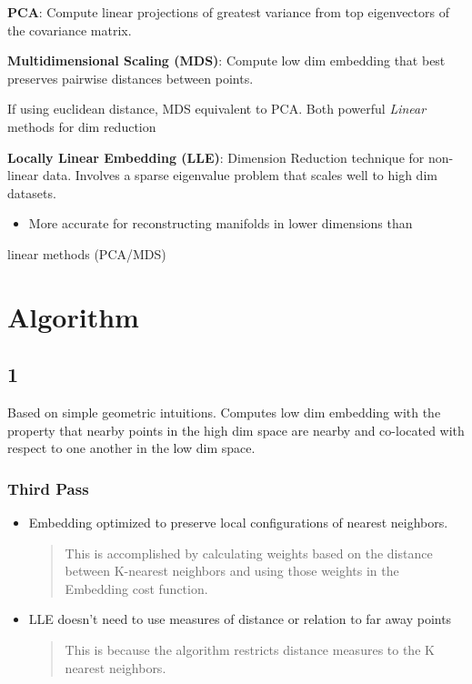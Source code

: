 \documentclass[11pt]{article}
\begin{document}
\textbf{PCA}: Compute linear projections of greatest variance from top eigenvectors
 of the covariance matrix.

\textbf{Multidimensional Scaling (MDS)}: Compute low dim embedding that best preserves pairwise distances between points.

If using euclidean distance, MDS equivalent to PCA. Both powerful \emph{Linear}
methods for dim reduction

\textbf{Locally Linear Embedding (LLE)}: Dimension Reduction technique for non-linear
 data. Involves a sparse eigenvalue problem that scales well to high dim
 datasets.
\begin{itemize}
\item More accurate for reconstructing manifolds in lower dimensions than
\end{itemize}
linear methods (PCA/MDS)

\section{Algorithm}
\label{sec:org1587b14}
\subsection{1}
\label{sec:orgc36deeb}
Based on simple geometric intuitions. Computes low dim embedding with the
property that nearby points in the high dim space are nearby and co-located with
respect to one another in the low dim space.

\subsubsection{Third Pass}
\label{sec:org9ba6a15}
\begin{itemize}
\item Embedding optimized to preserve local configurations of nearest neighbors.
\begin{quote}
This is accomplished by calculating weights based on the distance between
K-nearest neighbors and using those weights in the Embedding cost function.
\end{quote}

\item LLE doesn't need to use measures of distance or relation to far away points
\begin{quote}
This is because the algorithm restricts distance measures to the K nearest neighbors.
\end{quote}
\end{itemize}
\end{document}
